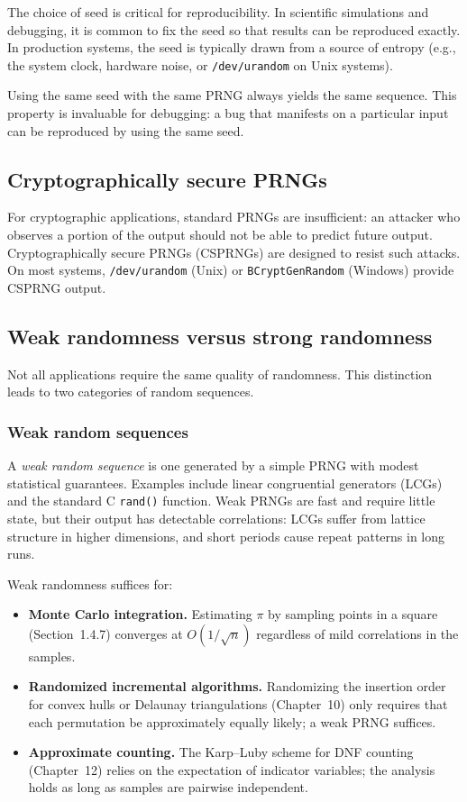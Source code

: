 \documentclass[twoside,12pt]{book}
\theoremstyle{plain}
\theoremstyle{definition}
\theoremstyle{remark}
\begin{document}
The choice of seed is critical for reproducibility. In scientific
simulations and debugging, it is common to fix the seed so that results can
be reproduced exactly. In production systems, the seed is typically drawn
from a source of entropy (e.g., the system clock, hardware noise, or
\texttt{/dev/urandom} on Unix systems).

Using the same seed with the same PRNG always yields the same sequence.
This property is invaluable for debugging: a bug that manifests on a
particular input can be reproduced by using the same seed.

\subsection{Cryptographically secure PRNGs}

For cryptographic applications, standard PRNGs are insufficient: an attacker
who observes a portion of the output should not be able to predict future
output. Cryptographically secure PRNGs (CSPRNGs) are designed to resist such
attacks. On most systems, \texttt{/dev/urandom} (Unix) or
\texttt{BCryptGenRandom} (Windows) provide CSPRNG output.

\subsection{Weak randomness versus strong randomness}

Not all applications require the same quality of randomness. This
distinction leads to two categories of random sequences.

\subsubsection{Weak random sequences}

A \emph{weak random sequence} is one generated by a simple PRNG with modest
statistical guarantees. Examples include linear congruential generators
(LCGs) and the standard C \texttt{rand()} function. Weak PRNGs are fast and
require little state, but their output has detectable correlations: LCGs
suffer from lattice structure in higher dimensions, and short periods cause
repeat patterns in long runs.

Weak randomness suffices for:
\begin{itemize}
\item \textbf{Monte Carlo integration.} Estimating $\pi$ by sampling points
in a square (Section~1.4.7) converges at $O(1/\sqrt{n})$ regardless of mild
correlations in the samples.
\item \textbf{Randomized incremental algorithms.} Randomizing the insertion
order for convex hulls or Delaunay triangulations (Chapter~10) only requires
that each permutation be approximately equally likely; a weak PRNG suffices.
\item \textbf{Approximate counting.} The Karp--Luby scheme for DNF counting
(Chapter~12) relies on the expectation of indicator variables; the analysis
holds as long as samples are pairwise independent.
\end{itemize}
\end{document}
